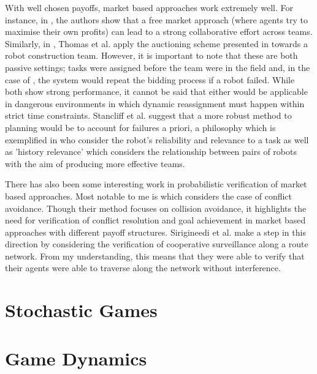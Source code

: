 \documentclass[../sample.tex]{subfiles}
\begin{document}
With well chosen payoffs, market based approaches work extremely well. For instance, in
\cite{Dias2000ASystem}, the authors show that a free market approach (where agents try to maximise
their own profits) can lead to a strong collaborative effort across teams. Similarly, in
\cite{Thomas2005Multi-robotScenarios}, Thomas et al. apply the auctioning scheme presented in
\cite{Gerkey2002Sold:Coordination} towards a robot construction team. However, it is important to
note that these are both passive settings; tasks were assigned before the team were in the field
and, in the case of \cite{Gerkey2002Sold:Coordination}, the system would repeat the bidding process
if a robot failed. While both show strong performance, it cannot be said that either would be
applicable in dangerous environments in which dynamic reassignment must happen within strict time
constraints. Stancliff et al. \cite{Stancliff2009PlanningAllocation} suggest that a more robust
method to planning would be to account for failures a priori, a philosophy which is exemplified in
\cite{Chen2010ACollaboration} who consider the robot's reliability and relevance to a task as well
as 'history relevance' which considers the relationship between pairs of robots with the aim of
producing more effective teams.

There has also been some interesting work in probabilistic verification of market based approaches. 
Most notable to me is \cite{Pallottino2007ProbabilisticAvoidance} which considers the case of
conflict avoidance. Though their method focuses on collision avoidance, it highlights the need for
verification of conflict resolution and goal achievement in market based approaches with different
payoff structures. Sirigineedi et al. \cite{Sirigineedi2010DecentralisedApproach} make a step in
this direction by considering the verification of cooperative surveillance along a route network. 
From my understanding, this means that they were able to verify that their agents were able to
traverse along the network without interference. 

\section{Stochastic Games}


\section{Game Dynamics}
\end{document}
